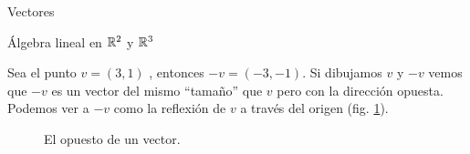 \begin{chapter}{Vectores}
\begin{section}{\'Algebra lineal en $\mathbb R^2$ y $\mathbb R^3$}
    
    \begin{ejemplo*} Sea el punto $v =(3, 1)$ , entonces $-v = (- 3, - 1)$. Si dibujamos $v$ y $-v$ vemos que $-v$ es un vector del mismo ``tamaño'' que $v$ pero con la dirección opuesta. Podemos ver a $-v$ como la reflexión de $v$ a través del origen (fig. \ref{fig-vector-opuesto}). 
    \begin{figure}[h]
    	\centering
        \caption{El opuesto de un vector.}\label{fig-vector-opuesto}
    \end{figure}
    \end{ejemplo*}





\end{section}
\end{chapter}
